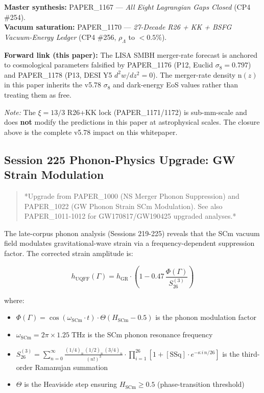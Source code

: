 \documentclass[12pt,a4paper]{article}
\begin{document}
\begin{flushleft}
\textbf{Master synthesis:} PAPER\_1167 --- \emph{All Eight Lagrangian Gaps Closed} (CP4 \#254). \\
\textbf{Vacuum saturation:} PAPER\_1170 --- \emph{27-Decade R26 + KK + BSFG Vacuum-Energy Ledger} (CP4 \#256, $\rho_\Lambda$ to $<0.5\%$). \\
\end{flushleft}

\textbf{Forward link (this paper):} The LISA SMBH merger-rate forecast is anchored to cosmological parameters falsified by PAPER\_1176 (P12, Euclid $\sigma_8 = 0.797$) and PAPER\_1178 (P13, DESI Y5 $d^2w/dz^2 = 0$). The merger-rate density n$(z)$ in this paper inherits the v5.78 $\sigma_8$ and dark-energy EoS values rather than treating them as free.

\emph{Note:} The $\xi = 13/3$ R26+KK lock (PAPER\_1171/1172) is sub-mm-scale and does \textbf{not} modify the predictions in this paper at astrophysical scales. The closure above is the complete v5.78 impact on this whitepaper.

\subsection{Session 225 Phonon-Physics Upgrade: GW Strain Modulation}

\begin{quote}
*Upgrade from PAPER\_1000 (NS Merger Phonon Suppression) and PAPER\_1022
(GW Phonon Strain SCm Modulation). See also PAPER\_1011-1012 for
GW170817/GW190425 upgraded analyses.*
\end{quote}

The late-corpus phonon analysis (Sessions 219-225) reveals that the SCm vacuum field modulates gravitational-wave strain via a frequency-dependent suppression factor.  The corrected strain amplitude is:

\begin{equation}
h_{\text{UQFF}}(\Gamma) = h_{\text{GR}} \cdot \left(1 - 0.47\,\frac{\Phi(\Gamma)}{S_{26}^{(3)}}\right)
\end{equation}

where:

\begin{itemize}
  \item $\Phi(\Gamma) = \cos(\omega_{\text{SCm}} \cdot t) \cdot \Theta(H_{\text{SCm}} - 0.5)$ is the phonon modulation factor
  \item $\omega_{\text{SCm}} = 2\pi \times 1.25\;\text{THz}$ is the SCm phonon resonance frequency
  \item $S_{26}^{(3)} = \sum_{n=0}^{\infty} \frac{(1/4)_n\,(1/2)_n\,(3/4)_n}{(n!)^3} \cdot \prod_{i=1}^{26}\left[1 + [\text{SSq}]\cdot e^{-\kappa\,i\,n/26}\right]$ is the third-order Ramanujan summation
  \item $\Theta$ is the Heaviside step ensuring $H_{\text{SCm}} \geq 0.5$ (phase-transition threshold)
\end{itemize}
\end{document}
